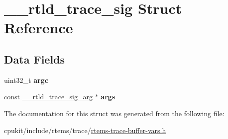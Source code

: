 \hypertarget{struct____rtld__trace__sig}{}\section{\+\_\+\+\_\+rtld\+\_\+trace\+\_\+sig Struct Reference}
\label{struct____rtld__trace__sig}
\subsection*{Data Fields}
\begin{DoxyCompactItemize}
\item 
\mbox{\label{struct____rtld__trace__sig_a9614c531f59a50c1dd98a7335be6da41}} 
uint32\+\_\+t {\bfseries argc}
\item 
\mbox{\label{struct____rtld__trace__sig_ab1101425b302d3f8e0f229eac21592cd}} 
const \mbox{\hyperlink{struct____rtld__trace__sig__arg}{\+\_\+\+\_\+rtld\+\_\+trace\+\_\+sig\+\_\+arg}} $\ast$ {\bfseries args}
\end{DoxyCompactItemize}


The documentation for this struct was generated from the following file\+:\begin{DoxyCompactItemize}
\item 
cpukit/include/rtems/trace/\mbox{\hyperlink{rtems-trace-buffer-vars_8h}{rtems-\/trace-\/buffer-\/vars.\+h}}\end{DoxyCompactItemize}
